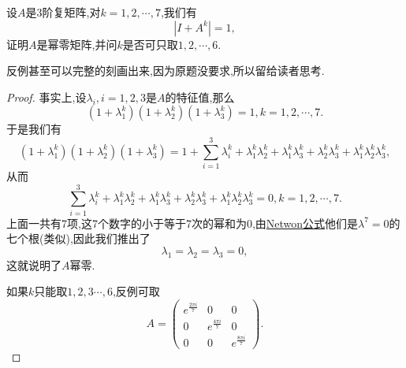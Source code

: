 \documentclass[../../main.tex]{subfiles}
\begin{document}
\begin{example}\label{example:例题028}
设\( A \)是3阶复矩阵,对\( k = 1,2,\cdots,7 \),我们有
\[
|I + A^k| = 1,
\]
证明\( A \)是幂零矩阵,并问\( k \)是否可只取\( 1,2,\cdots,6 \).
\end{example}
\begin{note}
反例甚至可以完整的刻画出来,因为原题没要求,所以留给读者思考.
\end{note}
\begin{proof}
事实上,设\( \lambda_i,i = 1,2,3 \)是\( A \)的特征值,那么
\[
(1 + \lambda_1^k)(1 + \lambda_2^k)(1 + \lambda_3^k) = 1,k = 1,2,\cdots,7.
\]
于是我们有
\[
(1 + \lambda_1^k)(1 + \lambda_2^k)(1 + \lambda_3^k) = 1 + \sum_{i = 1}^3 \lambda_i^k + \lambda_1^k\lambda_2^k + \lambda_1^k\lambda_3^k + \lambda_2^k\lambda_3^k + \lambda_1^k\lambda_2^k\lambda_3^k,
\]
从而
\[
\sum_{i = 1}^3 \lambda_i^k + \lambda_1^k\lambda_2^k + \lambda_1^k\lambda_3^k + \lambda_2^k\lambda_3^k + \lambda_1^k\lambda_2^k\lambda_3^k = 0,k = 1,2,\cdots,7.
\]
上面一共有7项,这7个数字的小于等于7次的幂和为0,由\hyperref[theorem:Netwon公式]{Netwon公式}他们是\( \lambda^7 = 0 \)的七个根(类似),因此我们推出了
\[
\lambda_1 = \lambda_2 = \lambda_3 = 0,
\]
这就说明了\( A \)幂零.

如果\( k \)只能取\( 1,2,3\cdots,6 \),反例可取
\[
A = \begin{pmatrix}
e^{\frac{2\pi i}{7}} & 0 & 0 \\
0 & e^{\frac{4\pi i}{7}} & 0 \\
0 & 0 & e^{\frac{8\pi i}{7}}
\end{pmatrix}.
\]

\end{proof}
\end{document}
